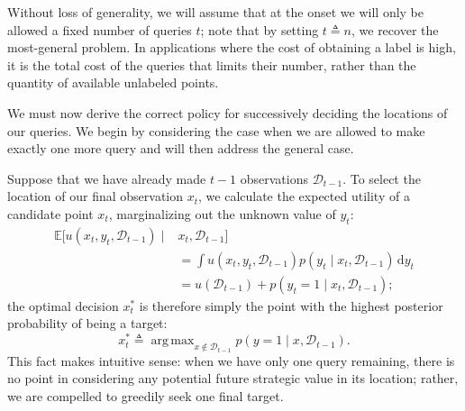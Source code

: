 \documentclass{acm_proc_article-sp}
\newcommand{\cm}[1]{\mathcal{#1}}
\newcommand{\data}{\cm{D}}
\newcommand{\given}{\mid}
\newcommand{\intd}[1]{\,\mathrm{d}#1}
\newcommand{\deq}{\triangleq}
\DeclareMathOperator*{\argmax}{arg\,max}
\begin{document}
Without loss of generality, we will assume that at the onset we will
only be allowed a fixed number of queries $t$; note that by setting $t
\deq n$, we recover the most-general problem.  In applications where
the cost of obtaining a label is high, it is the total cost of the
queries that limits their number, rather than the quantity of
available unlabeled points.  

We must now derive the correct policy for successively deciding the
locations of our queries.  We begin by considering the case when we
are allowed to make exactly one more query and will then address the
general case.

Suppose that we have already made $t-1$ observations $\data_{t-1}$.
To select the location of our final observation $x_t$, we calculate
the expected utility of a candidate point $x_t$, marginalizing out the
unknown value of $y_t$:
\begin{align*}
  \mathbb{E}
  \bigl[
    u(x_t, y_t, \data_{t-1}) \given{}&{}x_t, \data_{t-1} 
  \bigr]
  \\
  &=
  \int u(x_t, y_t, \data_{t-1}) p(y_t \given x_t, \data_{t-1}) \intd{y_t} 
  \\
  &=
  u(\data_{t-1}) + p(y_t = 1 \given x_t, \data_{t-1});
\end{align*}
the optimal decision $x_t^\ast$ is therefore simply the point with the
highest posterior probability of being a target:
\begin{equation}\label{onestep}
  x_t^\ast 
  \triangleq 
  \argmax_{x \notin \data_{t-1}} 
  p(y = 1\given x, \data_{t-1}).
\end{equation}
This fact makes intuitive sense: when we have only one query
remaining, there is no point in considering any potential future
strategic value in its location; rather, we are compelled to greedily
seek one final target.
\end{document}
